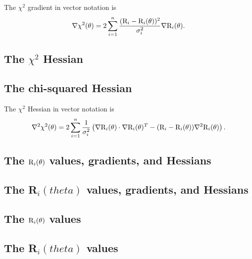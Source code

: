 The $\chi^2$ gradient in vector notation is
\begin{equation}
 \nabla \chi^2(\theta) = 2 \sum_{i=1}^n \frac{(\mathrm{R}_i - \mathrm{R}_i(\theta))^2}{\sigma_i^2} \nabla \mathrm{R}_i(\theta).
\end{equation}



\begin{latexonly}
    \subsection{The $\chi^2$ Hessian}
\end{latexonly}
\begin{htmlonly}
    \subsection{The chi-squared Hessian}
\end{htmlonly}

The $\chi^2$ Hessian in vector notation is
\begin{equation}
 \nabla^2 \chi^2(\theta) = 2 \sum_{i=1}^n \frac{1}{\sigma_i^2} \left(\nabla \mathrm{R}_i(\theta) \cdot \nabla \mathrm{R}_i(\theta)^T - (\mathrm{R}_i - \mathrm{R}_i(\theta)) \nabla^2 \mathrm{R}_i(\theta) \right).
\end{equation}




\newpage
\begin{latexonly}
    \section{The $\mathrm{R}_i(\theta)$ values, gradients, and Hessians}
\end{latexonly}
\begin{htmlonly}
    \section{The R$_i(theta)$ values, gradients, and Hessians}
\end{htmlonly}


\begin{latexonly}
    \subsection{The $\mathrm{R}_i(\theta)$ values}
\end{latexonly}
\begin{htmlonly}
    \subsection{The R$_i(theta)$ values}
\end{htmlonly}

